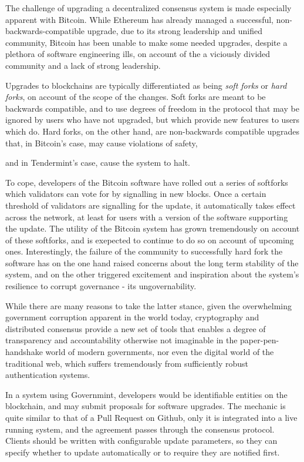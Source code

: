The challenge of upgrading a decentralized consensus system is made especially apparent with Bitcoin.
While Ethereum has already managed a successful, non-backwards-compatible upgrade, 
due to its strong leadership and unified community,
Bitcoin has been unable to make some needed upgrades,
despite a plethora of software engineering ills,
on account of the a viciously divided community and a lack of strong leadership.

Upgrades to blockchains are typically differentiated as being \emph{soft forks} or \emph{hard forks},
on account of the scope of the changes.
Soft forks are meant to be backwards compatible, and to use degrees of freedom in the protocol that may be ignored
by users who have not upgraded, but which provide new features to users which do.
Hard forks, on the other hand, are non-backwards compatible upgrades that,
in Bitcoin's case, may cause violations of safety, 

and in Tendermint's case, cause the system to halt.

To cope, developers of the Bitcoin software have rolled out a series of softforks which validators can vote for
by signalling in new blocks. 
Once a certain threshold of validators are signalling for the update,
it automatically takes effect across the network, at least for users with a version of the software supporting the update.
The utility of the Bitcoin system has grown tremendously on account of these softforks, 
and is exepected to continue to do so on account of upcoming ones.
Interestingly, the failure of the community to successfully hard fork the software has
on the one hand raised concerns about the long term stability of the system,
and on the other triggered excitement and inspiration about the system's resilience to corrupt governance - its ungovernability.

While there are many reasons to take the latter stance, 
given the overwhelming government corruption apparent in the world today,
cryptography and distributed consensus provide a new set of tools that enables a degree
of transparency and accountability otherwise not imaginable in the paper-pen-handshake world of modern governments,
nor even the digital world of the traditional web, which suffers tremendously from sufficiently robust authentication systems.

In a system using Governmint, developers would be identifiable entities on the blockchain,
and may submit proposals for software upgrades. 
The mechanic is quite similar to that of a Pull Request on Github, 
only it is integrated into a live running system,
and the agreement passes through the consensus protocol.
Clients should be written with configurable update parameters, 
so they can specify whether to update automatically or to require they are notified first.

